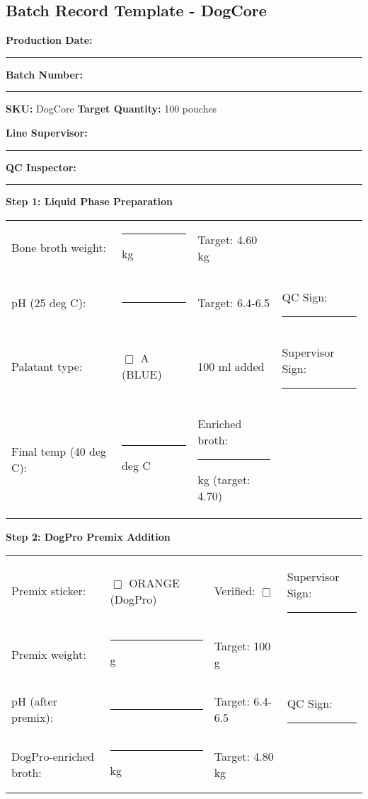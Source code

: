 
\clearpage
\subsection*{Batch Record Template - DogCore}

\noindent\textbf{Production Date:} \rule{3cm}{0.4pt} \hspace{2cm} \textbf{Batch Number:} \rule{3cm}{0.4pt}

\noindent\textbf{SKU:} DogCore \hspace{2cm} \textbf{Target Quantity:} 100 pouches

\noindent\textbf{Line Supervisor:} \rule{4cm}{0.4pt} \hspace{1cm} \textbf{QC Inspector:} \rule{4cm}{0.4pt}

\vspace{1em}

\noindent\textbf{Step 1: Liquid Phase Preparation}

\begin{tabular}{@{}lp{3cm}p{3cm}p{3cm}@{}}
Bone broth weight: & \rule{2.5cm}{0.4pt} kg & Target: 4.60 kg & \\
pH (25 deg C): & \rule{2.5cm}{0.4pt} & Target: 6.4-6.5 & QC Sign: \rule{2cm}{0.4pt} \\
Palatant type: & $\Box$ A (BLUE) & 100 ml added & Supervisor Sign: \rule{2cm}{0.4pt} \\
Final temp (40 deg C): & \rule{2.5cm}{0.4pt} deg C & Enriched broth: \rule{2cm}{0.4pt} kg (target: 4.70) & \\
\end{tabular}

\vspace{1em}

\noindent\textbf{Step 2: DogPro Premix Addition}

\begin{tabular}{@{}lp{3cm}p{3cm}p{3cm}@{}}
Premix sticker: & $\Box$ ORANGE (DogPro) & Verified: $\Box$ & Supervisor Sign: \rule{2cm}{0.4pt} \\
Premix weight: & \rule{2.5cm}{0.4pt} g & Target: 100 g & \\
pH (after premix): & \rule{2.5cm}{0.4pt} & Target: 6.4-6.5 & QC Sign: \rule{2cm}{0.4pt} \\
DogPro-enriched broth: & \rule{2.5cm}{0.4pt} kg & Target: 4.80 kg & \\
\end{tabular}

